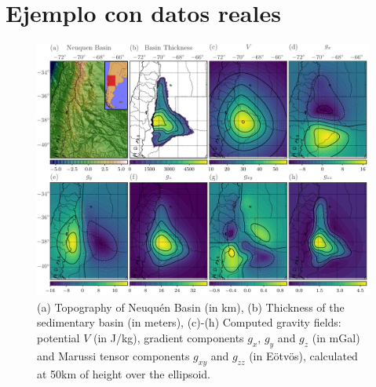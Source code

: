 \documentclass[a4paper,10pt]{article}
\begin{document}

\section{Ejemplo con datos reales}


\begin{figure}
\centering
\includegraphics[width=\linewidth]{../manuscript/figures/neuquen-basin.pdf}
\caption{(a) Topography of Neuqu\'en Basin (in km),
         (b) Thickness of the sedimentary basin (in meters),
         (c)-(h) Computed gravity fields: potential $V$ (in J/kg), gradient components $g_x$, $g_y$ and $g_z$ (in mGal) and Marussi tensor components $g_{xy}$ and $g_{zz}$ (in Eötvös), calculated at 50km of height over the ellipsoid.}
\label{fig:neuquen-basin}
\end{figure}





\end{document}
